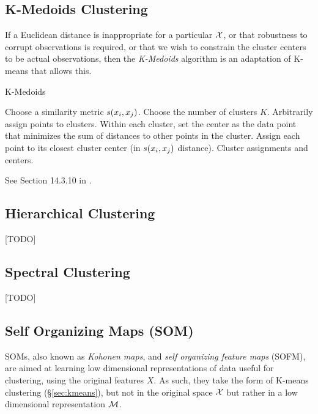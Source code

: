 \subsection{K-Medoids Clustering}
\label{sec:k_medoids}


If a Euclidean distance is inappropriate for a particular $\mathcal{X}$, or that robustness to corrupt observations is required, or that we wish to constrain the cluster centers to be actual observations, then the \emph{K-Medoids} algorithm is an adaptation of K-means that allows this.

\begin{algorithm}[H]
\caption{K-Medoids}
\begin{algorithmic}
\State Choose a similarity metric $s(x_i,x_j)$.
\State Choose the number of clusters $K$.
\State Arbitrarily assign points to clusters.
	\State Within each cluster, set the center as the data point that minimizes the sum of distances to other points in the cluster.
	\State Assign each point to its closest cluster center (in $s(x_i,x_j)$ distance).
\EndWhile
\State \Return Cluster assignments and centers.
\end{algorithmic}
\end{algorithm}


See Section 14.3.10 in \cite{hastie_elements_2003}.








\subsection{Hierarchical Clustering}
\label{sec:hierarchical}
[TODO]








\subsection{Spectral Clustering}
\label{sec:spectral_clustering}
[TODO]





\subsection{Self Organizing Maps (SOM)}
\label{sec:som}
SOMs, also known as \emph{Kohonen maps}, and \emph{self organizing feature maps} (SOFM), are aimed at learning low dimensional representations of data useful for clustering, using the original features $X$.
As such, they take the form of K-means clustering (\S\ref{sec:kmeans}), but not in the original space $\mathcal{X}$ but rather in a low dimensional representation $\mathcal{M}$.


